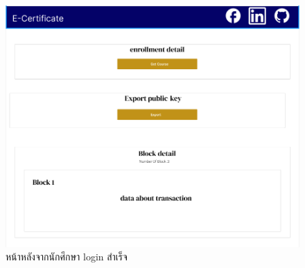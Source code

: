 \graphicspath{ {./images/} }
\begin{figure}[htbp]
  \centering 
  \includegraphics[scale=0.5]{st.png}
  \caption[หน้าหลังจากนักศึกษา login สำเร็จ]{หน้าหลังจากนักศึกษา login สำเร็จ}
  \label{fig:student}
\end{figure}


